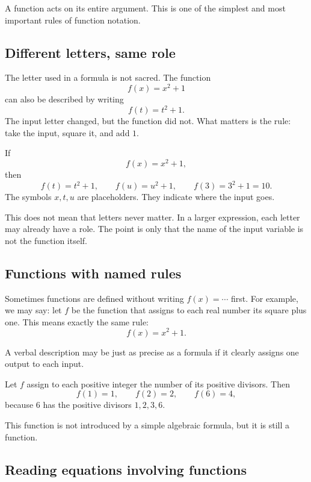 A function acts on its entire argument. This is one of the simplest and most important rules of function notation.

\subsection*{Different letters, same role}

The letter used in a formula is not sacred. The function
\[
f(x)=x^2+1
\]
can also be described by writing
\[
f(t)=t^2+1.
\]
The input letter changed, but the function did not. What matters is the rule: take the input, square it, and add \(1\).

\begin{examplebox}
If
\[
f(x)=x^2+1,
\]
then
\[
f(t)=t^2+1,
\qquad
f(u)=u^2+1,
\qquad
f(3)=3^2+1=10.
\]
The symbols \(x,t,u\) are placeholders. They indicate where the input goes.
\end{examplebox}

This does not mean that letters never matter. In a larger expression, each letter may already have a role. The point is only that the name of the input variable is not the function itself.

\subsection*{Functions with named rules}

Sometimes functions are defined without writing \(f(x)=\cdots\) first. For example, we may say: let \(f\) be the function that assigns to each real number its square plus one. This means exactly the same rule:
\[
f(x)=x^2+1.
\]

A verbal description may be just as precise as a formula if it clearly assigns one output to each input.

\begin{examplebox}
Let \(f\) assign to each positive integer the number of its positive divisors. Then
\[
f(1)=1,
\qquad
f(2)=2,
\qquad
f(6)=4,
\]
because \(6\) has the positive divisors \(1,2,3,6\).

This function is not introduced by a simple algebraic formula, but it is still a function.
\end{examplebox}

\subsection*{Reading equations involving functions}


